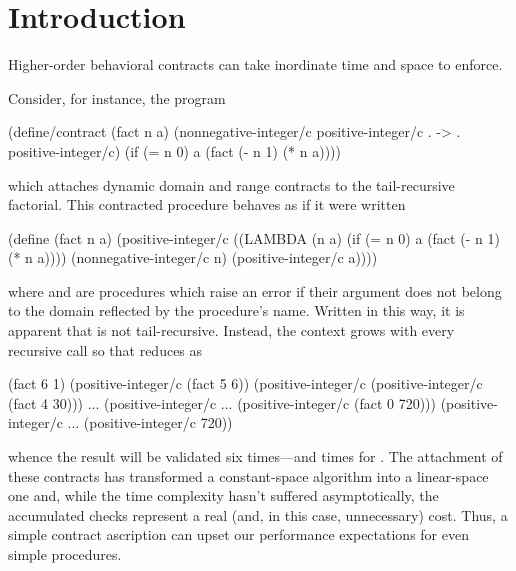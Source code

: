 \section{Introduction}

Higher-order behavioral contracts can take inordinate time and space to enforce.



Consider, for instance, the program
\begin{schemedisplay}
(define/contract (fact n a)
  (nonnegative-integer/c positive-integer/c . -> . positive-integer/c)
  (if (= n 0)
      a
      (fact (- n 1) (* n a))))
\end{schemedisplay}
which attaches dynamic domain and range contracts to the tail-recursive factorial.
This contracted procedure behaves as if it were written
\begin{schemedisplay}
(define (fact n a)
  (positive-integer/c
   ((LAMBDA (n a)
      (if (= n 0)
          a
          (fact (- n 1) (* n a))))
    (nonnegative-integer/c n)
    (positive-integer/c a))))
\end{schemedisplay}
where  and  are procedures which raise an error if their argument does not belong to the domain reflected by the procedure's name.
Written in this way, it is apparent that  is not tail-recursive.
Instead, the context grows with every recursive call so that  reduces as
\begin{schemedisplay}
(fact 6 1)
(positive-integer/c (fact 5 6))
(positive-integer/c (positive-integer/c (fact 4 30)))
...
(positive-integer/c ... (positive-integer/c (fact 0 720)))
(positive-integer/c ... (positive-integer/c 720))
\end{schemedisplay}
whence the result will be validated six times---and  times for .
The attachment of these contracts has transformed a constant-space algorithm into a linear-space one and, while the time complexity hasn't suffered asymptotically, the accumulated checks represent a real (and, in this case, unnecessary) cost.
Thus, a simple contract ascription can upset our performance expectations for even simple procedures.

